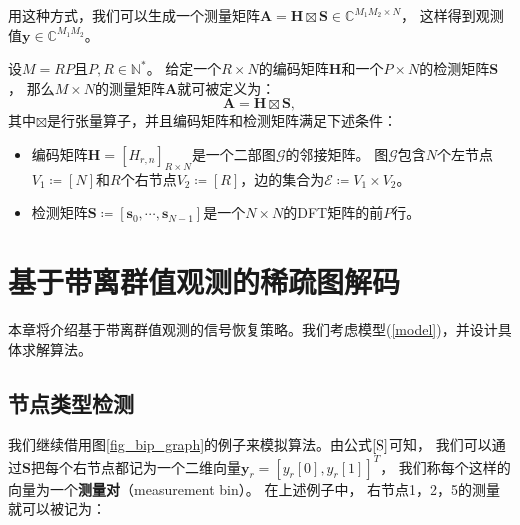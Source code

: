 \documentclass[AutoFakeBold]{LZUThesis}
\begin{document}
用这种方式，我们可以生成一个测量矩阵$\mathbf{A} = \mathbf{H} \boxtimes \mathbf{S} \in \mathbb{C}^{M_1 M_2 \times N}$，
这样得到观测值$\mathbf{y} \in \mathbb{C}^{M_1 M_2}$。
\begin{definition}[测量矩阵]
    设$M = RP$且$P, R \in \mathbb{N}^*$。
    给定一个$R \times N$的编码矩阵$\mathbf{H}$和一个$P \times N$的检测矩阵$\mathbf{S}$，
    那么$M \times N$的测量矩阵$\mathbf{A}$就可被定义为：
    \begin{equation}
        \mathbf{A} = \mathbf{H} \boxtimes \mathbf{S},
    \end{equation}
    其中$\boxtimes$是行张量算子，并且编码矩阵和检测矩阵满足下述条件：
    \begin{itemize}
        \item 编码矩阵$\mathbf{H} = [H_{r, n}]_{R \times N}$是一个二部图$\mathcal{G}$的邻接矩阵。
        图$\mathcal{G}$包含$N$个左节点$V_1 \coloneq [N]$和$R$个右节点$V_2 \coloneq [R]$，边的集合为$\mathcal{E} \coloneq V_1 \times V_2$。
        \item 检测矩阵$\mathbf{S} \coloneq \left[\mathbf{s}_0, \cdots, \mathbf{s}_{N-1}\right]$是一个$N \times N$的DFT矩阵的前$P$行。
    \end{itemize}
\end{definition}

\chapter{基于带离群值观测的稀疏图解码}
\label{3}

本章将介绍基于带离群值观测的信号恢复策略。我们考虑模型(\ref{model})，并设计具体求解算法。

\section{节点类型检测}

我们继续借用图\ref{fig_bip_graph}的例子来模拟算法。由公式$\ref{S}$可知，
我们可以通过$\mathbf{S}$把每个右节点都记为一个二维向量$\mathbf{y}_r = [y_r[0], y_r[1]]^T$，
我们称每个这样的向量为一个\textbf{测量对}（measurement bin）。
在上述例子中，
右节点1，2，5的测量就可以被记为：
\end{document}
